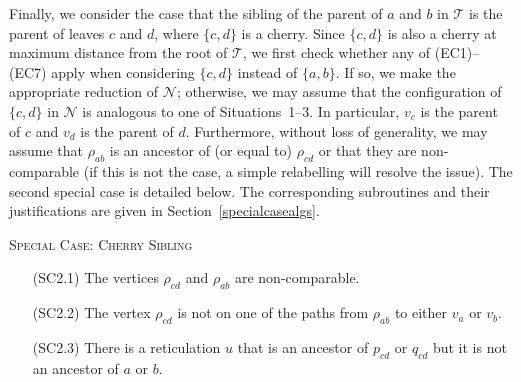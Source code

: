 \documentclass[11pt]{amsart}
\begin{document}
Finally, we consider the case that the sibling of the parent of $a$ and $b$ in ${{\mathcal T}}$ is the parent of leaves $c$ and $d$, where $\{c, d\}$ is a cherry. Since $\{c, d\}$ is also a cherry at maximum distance from the root of ${{\mathcal T}}$, we first check whether any of (EC1)--(EC7) apply when considering $\{c, d\}$ instead of $\{a, b\}$. If so, we make the appropriate reduction of ${{\mathcal N}}$; otherwise, we may assume that the configuration of $\{c, d\}$ in ${{\mathcal N}}$ is analogous to one of Situations~1--3. In particular, $v_c$ is the parent of $c$ and $v_d$ is the parent of $d$. Furthermore, without loss of generality, we may assume that $\rho_{ab}$ is an ancestor of (or equal to) $\rho_{cd}$ or that they are non-comparable (if this is not the case, a simple relabelling will resolve the issue). The second special case is detailed below. The corresponding subroutines and their justifications are given in Section~\ref{specialcasealgs}.

\noindent\textsc{Special Case: Cherry Sibling}
\begin{itemize}
\item[(SC2.1)] The vertices $\rho_{cd}$ and $\rho_{ab}$ are non-comparable.

\item[(SC2.2)] The vertex $\rho_{cd}$ is not on one of the paths from $\rho_{ab}$ to either $v_a$ or $v_b$.

\item[(SC2.3)] There is a reticulation $u$ that is an ancestor of $p_{cd}$ or $q_{cd}$ but it is not an ancestor of $a$ or $b$.
\end{itemize}
\end{document}
